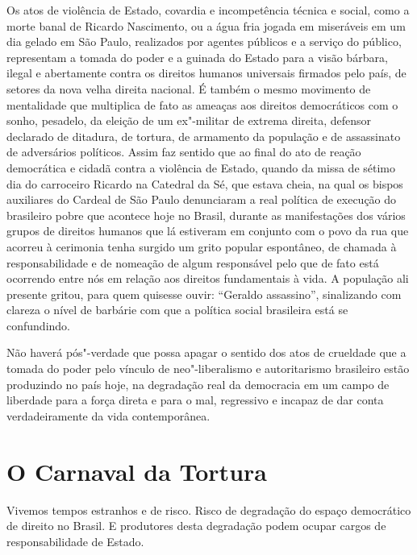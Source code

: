 Os atos de violência de Estado, covardia e incompetência técnica e
social, como a morte banal de Ricardo Nascimento, ou a água fria jogada
em miseráveis em um dia gelado em São Paulo, realizados por agentes
públicos e a serviço do público, representam a tomada do poder e a
guinada do Estado para a visão bárbara, ilegal e abertamente contra os
direitos humanos universais firmados pelo país, de setores da nova velha
direita nacional. É também o mesmo movimento de mentalidade que
multiplica de fato as ameaças aos direitos democráticos com o sonho,
pesadelo, da eleição de um ex"-militar de extrema direita, defensor
declarado de ditadura, de tortura, de armamento da população e de
assassinato de adversários políticos. Assim faz sentido que ao final do
ato de reação democrática e cidadã contra a violência de Estado, quando
da missa de sétimo dia do carroceiro Ricardo na Catedral da Sé, que
estava cheia, na qual os bispos auxiliares do Cardeal de São Paulo
denunciaram a real política de execução do brasileiro pobre que acontece
hoje no Brasil, durante as manifestações dos vários grupos de direitos
humanos que lá estiveram em conjunto com o povo da rua que acorreu à
cerimonia tenha surgido um grito popular espontâneo, de chamada à
responsabilidade e de nomeação de algum responsável pelo que de fato
está ocorrendo entre nós em relação aos direitos fundamentais à vida. A
população ali presente gritou, para quem quisesse ouvir: ``Geraldo
assassino'', sinalizando com clareza o nível de barbárie com que a
política social brasileira está se confundindo.

Não haverá pós"-verdade que possa apagar o sentido dos atos de crueldade
que a tomada do poder pelo vínculo de neo"-liberalismo e autoritarismo
brasileiro estão produzindo no país hoje, na degradação real da
democracia em um campo de liberdade para a força direta e para o mal,
regressivo e incapaz de dar conta verdadeiramente da vida contemporânea.

\chapter{O Carnaval da Tortura}

\begin{center}
\end{center}

Vivemos tempos estranhos e de risco. Risco de degradação do espaço
democrático de direito no Brasil. E produtores desta degradação podem
ocupar cargos de responsabilidade de Estado.

